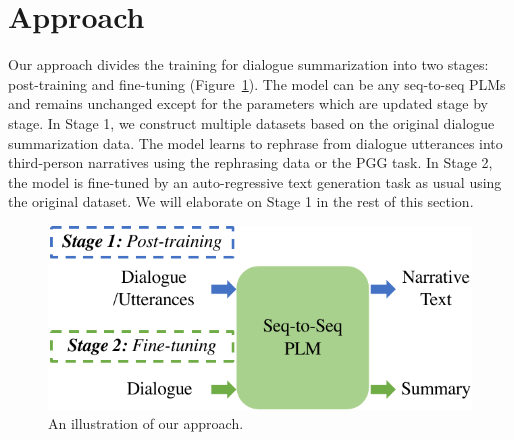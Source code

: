 \section{Approach}
\label{sec:approach}

Our approach divides the training for dialogue summarization into two stages: 
post-training and fine-tuning (Figure~\ref{fig:stage}). 
The model can be any seq-to-seq PLMs and remains unchanged
except for the parameters which are updated stage by stage.
In Stage 1, we construct multiple datasets based on the original dialogue summarization data.
The model learns to rephrase from dialogue utterances into
third-person narratives using the rephrasing data or the PGG task.
 In Stage 2, the model is fine-tuned by an auto-regressive
text generation task as usual using the original dataset. We will elaborate on Stage 1 in the rest of this section.


%	


\begin{figure}
	\centering
	\includegraphics[width=0.8\columnwidth]{stage.pdf}
	\caption{An illustration of our approach.}
	\label{fig:stage}
\end{figure}

